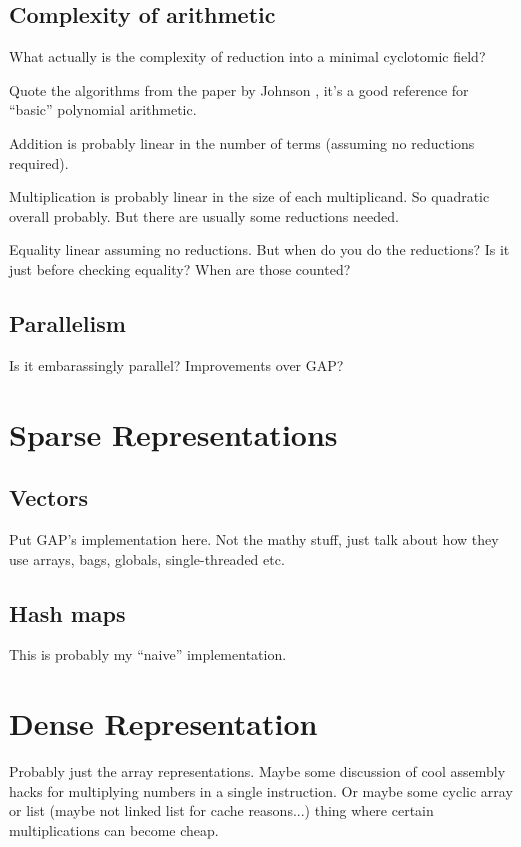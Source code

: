 \documentclass{article}
\begin{document}
\subsection{Complexity of arithmetic}

What actually is the complexity of reduction into a minimal cyclotomic
field?

Quote the algorithms from the paper by Johnson \cite{Johnson1974},
it's a good reference for ``basic'' polynomial arithmetic.

Addition is probably linear in the number of terms (assuming no
reductions required).

Multiplication is probably linear in the size of each multiplicand. So
quadratic overall probably. But there are usually some reductions
needed.

Equality linear assuming no reductions. But when do you do the
reductions? Is it just before checking equality? When are those
counted?

\subsection{Parallelism}

Is it embarassingly parallel? Improvements over GAP?

\section{Sparse Representations}

\subsection{Vectors}

Put GAP's implementation here. Not the mathy stuff, just talk about
how they use arrays, bags, globals, single-threaded etc.

\subsection{Hash maps}

This is probably my ``naive'' implementation.

\section{Dense Representation}

Probably just the array representations. Maybe some discussion of cool
assembly hacks for multiplying numbers in a single instruction. Or
maybe some cyclic array or list (maybe not linked list for cache
reasons...) thing where certain multiplications can become cheap.
\end{document}
